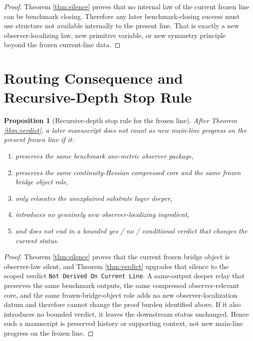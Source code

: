 \documentclass[11pt]{article}
\newtheorem{proposition}{Proposition}
\begin{document}
\begin{proof}
Theorem \ref{thm:silence} proves that no internal law of the current frozen line can be benchmark closing. Therefore any later benchmark-closing success must use structure not available internally to the present line. That is exactly a new observer-localizing law, new primitive variable, or new symmetry principle beyond the frozen current-line data.
\end{proof}

\section{Routing Consequence and Recursive-Depth Stop Rule}

\begin{proposition}[Recursive-depth stop rule for the frozen line]
\label{prop:stop}
After Theorem \ref{thm:verdict}, a later manuscript does \emph{not} count as new main-line progress on the present frozen line if it:
\begin{enumerate}
    \item preserves the same benchmark one-metric observer package,
    \item preserves the same continuity-Hessian compressed core and the same frozen bridge object role,
    \item only relocates the unexplained substrate layer deeper,
    \item introduces no genuinely new observer-localizing ingredient,
    \item and does not end in a bounded yes / no / conditional verdict that changes the current status.
\end{enumerate}
\end{proposition}

\begin{proof}
Theorem \ref{thm:silence} proves that the current frozen bridge object is observer-law silent, and Theorem \ref{thm:verdict} upgrades that silence to the scoped verdict \texttt{Not Derived On Current Line}. A same-output deeper relay that preserves the same benchmark outputs, the same compressed observer-relevant core, and the same frozen-bridge-object role adds no new observer-localization datum and therefore cannot change the proof burden identified above. If it also introduces no bounded verdict, it leaves the downstream status unchanged. Hence such a manuscript is preserved history or supporting context, not new main-line progress on the frozen line.
\end{proof}
\end{document}

